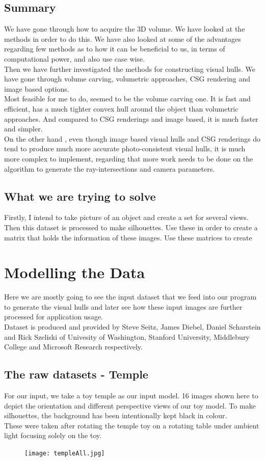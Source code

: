 \documentclass[a4paper]{report}
\begin{document}
\section{Summary}
We have gone through how to acquire the 3D volume. We have looked at the methods in order to do this. We have also looked at some of the advantages regarding few methods  as to  how it can be beneficial to us, in terms of computational power, and also use case wise.
\\
Then we have further investigated the methods for constructing visual hulls.
We have gone through volume carving, volumetric approaches, CSG rendering and image based options.
\\
Most feasible for me to do, seemed to be the volume carving one. It is fast and efficient, has a much tighter convex hull around the object than volumetric approaches. And compared to CSG renderings and image based, it is much faster and simpler.
\\
On the other hand , even though image based visual hulls and CSG renderings do tend to produce much more accurate photo-consistent visual hulls, it is much more complex to implement, regarding that more work needs to be done on the algorithm to generate the ray-intersections and camera parameters.
\section{What we are trying to solve}
Firstly, I intend to take picture of an object and create a set for several views. Then this dataset is processed to make silhouettes.
Use these in order to create a matrix that holds the information of these images. Use these matrices to create
\newpage
\chapter{Modelling the Data}
Here we are mostly going to see the input dataset that we feed into our program to generate the visual hulls and later see how these input images are further processed for application usage.
\\
Dataset is produced and provided by Steve Seitz, James Diebel, Daniel Scharstein and Rick Szeliski of Univesity of Washington,
Stanford University, Middlebury College and Microsoft Research respectively.
\section{The raw datasets - Temple}
For our input, we take a toy temple as our input model.
16 images shown here to depict the orientation and different perspective views of our toy model. To make silhouettes, the background has been intentionally kept black in colour.
\\
These were taken after rotating the temple toy on a rotating table under ambient light focusing solely on the toy.
\begin{figure}[h]
\texttt{[image: templeAll.jpg]} 
\end{figure}
\newpage
\end{document}
